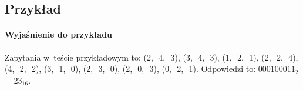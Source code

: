 \documentclass[zad,zawodnik,utf8]{sinol}
\begin{document}
\begin{tasktext}
\section{Przykład}

\paragraph{Wyjaśnienie do przykładu} Zapytania w~teście przykładowym to:
(2,\,~4,\,~3),
(3,\,~4,\,~3),
(1,\,~2,\,~1),
(2,\,~2,\,~4),
(4,\,~2,\,~2),
(3,\,~1,\,~0),
(2,\,~3,\,~0),
(2,\,~0,\,~3),
(0,\,~2,\,~1).
Odpowiedzi to: $\text{000100011}_2$ = $\text{23}_{16}$.

\end{tasktext}
\end{document}
